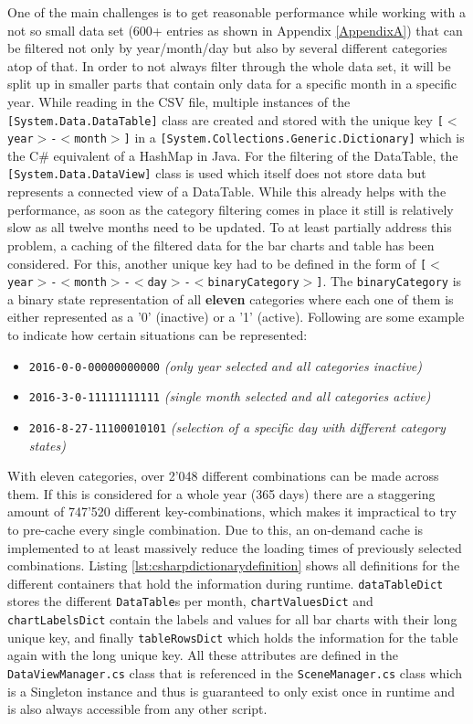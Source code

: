One of the main challenges is to get reasonable performance while working with a not so small data set (600+ entries as shown in Appendix \ref{AppendixA}) that can be filtered not only by year/month/day but also by several different categories atop of that. In order to not always filter through the whole data set, it will be split up in smaller parts that contain only data for a specific month in a specific year. While reading in the CSV file, multiple instances of the \texttt{[System.Data.DataTable]} class are created and stored with the unique key \texttt{[$<$year$>$-$<$month$>$]} in a \texttt{[System.Collections.Generic.Dictionary]} which is the C\# equivalent of a HashMap in Java. For the filtering of the DataTable, the \texttt{[System.Data.DataView]} class is used which itself does not store data but represents a connected view of a DataTable. While this already helps with the performance, as soon as the category filtering comes in place it still is relatively slow as all twelve months need to be updated. To at least partially address this problem, a caching of the filtered data for the bar charts and table has been considered. For this, another unique key had to be defined in the form of \texttt{[$<$year$>$-$<$month$>$-$<$day$>$-$<$binaryCategory$>$]}. The \texttt{binaryCategory} is a binary state representation of all \textbf{eleven} categories where each one of them is either represented as a '0' (inactive) or a '1' (active). Following are some example to indicate how certain situations can be represented:
\begin{itemize}[noitemsep,nolistsep]
	\item \texttt{2016-0-0-00000000000} \textit{(only year selected and all categories inactive)}
	\item \texttt{2016-3-0-11111111111} \textit{(single month selected and all categories active)}
	\item \texttt{2016-8-27-11100010101} \textit{(selection of a specific day with different category states)}
\end{itemize}
With eleven categories, over 2'048 different combinations can be made across them. If this is considered for a whole year (365 days) there are a staggering amount of 747'520 different key-combinations, which makes it impractical to try to pre-cache every single combination. Due to this, an on-demand cache is implemented to at least massively reduce the loading times of previously selected combinations. Listing \ref{lst:csharpdictionarydefinition} shows all definitions for the different containers that hold the information during runtime. \texttt{dataTableDict} stores the different \texttt{DataTable}s per month, \texttt{chartValuesDict} and \texttt{chartLabelsDict} contain the labels and values for all bar charts with their long unique key, and finally \texttt{tableRowsDict} which holds the information for the table again with the long unique key. All these attributes are defined in the \texttt{DataViewManager.cs} class that is referenced in the \texttt{SceneManager.cs} class which is a Singleton instance and thus is guaranteed to only exist once in runtime and is also always accessible from any other script.
